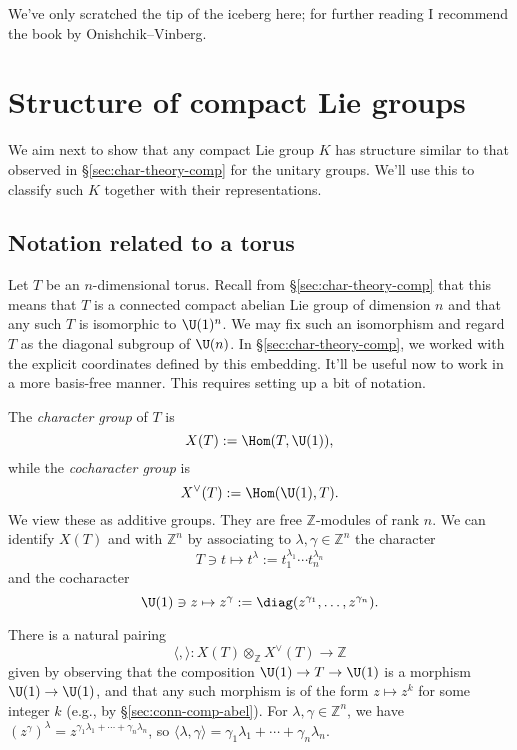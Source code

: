 \documentclass[reqno]{amsart} 
\begin{document}
We've only scratched the tip of the iceberg here; for further reading I recommend the book by Onishchik--Vinberg.

\newpage


\section{Structure of compact Lie groups}\label{sec:cnh2vouko6}
We aim next to show that any compact Lie group $K$ has structure similar to that observed in \S\ref{sec:char-theory-comp} for the unitary groups.  We'll use this to classify such $K$ together with their representations.

\subsection{Notation related to a torus}\label{sec:notat-relat-torus}
Let $T$ be an $n$-dimensional torus.  Recall from \S\ref{sec:char-theory-comp} that this means that $T$ is a connected compact abelian Lie group of dimension $n$ and that any such $T$ is isomorphic to $\U(1)^n$.  We may fix such an isomorphism and regard $T$ as the diagonal subgroup of $\U(n)$.  In \S\ref{sec:char-theory-comp}, we worked with the explicit coordinates defined by this embedding.  It'll be useful now to work in a more basis-free manner.  This requires setting up a bit of notation.


The \emph{character group} of $T$ is
\begin{equation*}
  X(T) := \Hom(T,\U(1)),
\end{equation*}
while the \emph{cocharacter group} is
\begin{equation*}
  X^\vee (T) := \Hom(\U(1),T).
\end{equation*}
We view these as additive groups.  They are free $\mathbb{Z}$-modules of rank $n$.  We can identify $X(T)$ and with $\mathbb{Z}^n$ by associating to $\lambda, \gamma \in \mathbb{Z}^n$ the character
\begin{equation*}
  T \ni t \mapsto t^{\lambda} := t_1^{\lambda_1} \dotsb t_n^{\lambda_n}
\end{equation*}
and the cocharacter
\begin{equation*}
  \U(1) \ni z \mapsto z^{\gamma} := \diag(z^{\gamma_1},\dotsc,z^{\gamma_n}).
\end{equation*}

There is a natural pairing
\begin{equation*}
  \langle , \rangle : X(T) \otimes_{\mathbb{Z}} X^\vee(T) \rightarrow \mathbb{Z}
\end{equation*}
given by observing that the composition $\U(1) \rightarrow T \rightarrow \U(1)$ is a morphism $\U(1) \rightarrow \U(1)$, and that any such morphism is of the form $z \mapsto z^k$ for some integer $k$ (e.g., by \S\ref{sec:conn-comp-abel}).  For $\lambda, \gamma \in \mathbb{Z}^n$, we have $(z^\gamma)^{\lambda} = z^{\gamma_1 \lambda_1 + \dotsb + \gamma_n \lambda_n}$, so $\langle \lambda, \gamma \rangle = \gamma_1 \lambda_1 + \dotsb + \gamma_n \lambda_n$.
\end{document}
